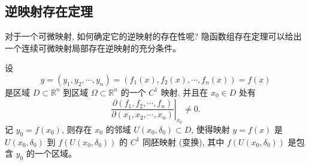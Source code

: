 \documentclass[UTF8,12pt,a4paper,fontset=fandol]{ctexart}
\begin{document}
\subsection{逆映射存在定理}

对于一个可微映射, 如何确定它的逆映射的存在性呢? 隐函数组存在定理可以给出一个连续可微映射局部存在逆映射的充分条件。

\begin{theorem}[逆映射存在定理]\label{course-theorem-14-4-4}\quad 设
\[
  y=(y_1,y_2,\cdots,y_n)=(f_1(x),f_2(x),\cdots,f_n(x))=f(x)
\]
是区域 $D\subset\mathbb R^n$ 到区域 $\Omega\subset\mathbb R^n$ 的一个 $C^1$ 映射, 并且在 $x_0\in D$ 处有
\[
  \left.
  \frac{\partial(f_1,f_2,\cdots,f_n)}
       {\partial(x_1,x_2,\cdots,x_n)}
  \right|_{x_0}
  \ne0.
\]
记 $y_0=f(x_0)$, 则存在 $x_0$ 的邻域 $U(x_0,\delta_0)\subset D$, 使得映射 $y=f(x)$ 是 $U(x_0,\delta_0)$ 到 $f(U(x_0,\delta_0))$ 的 $C^1$ 同胚映射 (变换), 其中 $f(U(x_0,\delta_0))$ 是包含 $y_0$ 的一个区域。

\end{theorem}
\end{document}
